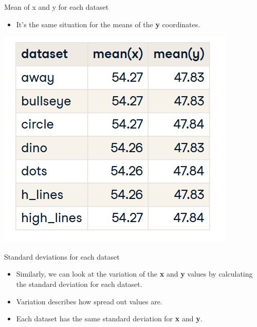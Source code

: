 \documentclass[
  ignorenonframetext,
]{beamer}
\providecommand{\tightlist}{%
  \setlength{\itemsep}{0pt}\setlength{\parskip}{0pt}}
\begin{document}
\begin{frame}{Mean of x and y for each dataset}
\label{mean-of-x-and-y-for-each-dataset}
\begin{itemize}
\tightlist
\item
  It's the same situation for the means of the \textbf{y} coordinates.
\end{itemize}

\includegraphics{../images/im3.png}
\end{frame}

\begin{frame}{Standard deviations for each dataset}
\label{standard-deviations-for-each-dataset}
\begin{itemize}
\item
  Similarly, we can look at the variation of the \textbf{x} and
  \textbf{y} values by calculating the standard deviation for each
  dataset.
\item
  Variation describes how spread out values are.
\item
  Each dataset has the same standard deviation for \textbf{x} and
  \textbf{y}.
\end{itemize}
\end{frame}
\end{document}
